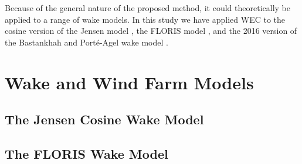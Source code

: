 \documentclass[a4paper]{jpconf}
\begin{document}
Because of the general nature of the proposed method, it could theoretically be applied to a range of wake models. In this study we have applied WEC to the cosine version of the Jensen model \cite{jensen1983}, the FLORIS model \cite{gebraad2014,thomas2017-Improving-FLORIS}, and the 2016 version of the Bastankhah and Port\'e-Agel wake model \cite{bastankhah2016}.

\section{Wake and Wind Farm Models}
\subsection{The Jensen Cosine Wake Model}
\subsection{The FLORIS Wake Model}
\end{document}
